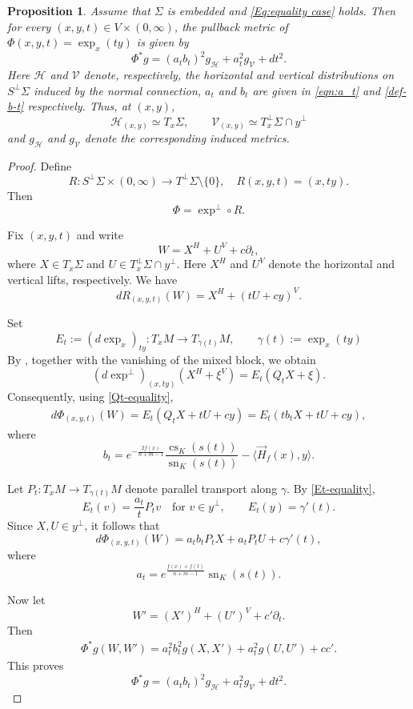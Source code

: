 \documentclass[psamsfonts]{amsart}
\newtheorem{prop}[thm]{Proposition}
\theoremstyle{definition}
\theoremstyle{remark}
\numberwithin{equation}{section}
\begin{document}
\begin{prop}\label{prop:equality-Pulledback} Assume that $\Sigma$ is embedded and \eqref{Eq:equality case} holds. Then for every $(x,y,t)\in V\times(0,\infty)$, the pullback metric of
    $\Phi(x,y,t)=\exp_x(ty)$ is given by
    $$\Phi^*g = (a_t  b_t )^2 g_{\mathcal H} + a_t^2 g_{\mathcal V} + dt^2.$$
    Here $\mathcal H$ and $\mathcal V$ denote, respectively, the horizontal and vertical distributions on $S^\perp\Sigma$ induced by the normal connection, $a_t$ and $b_t$ are given in \eqref{eqn:a_t} and \eqref{def-b-t} respectively. Thus, at $(x,y)$,
    $$\mathcal H_{(x,y)}\simeq T_x\Sigma, \qquad \mathcal V_{(x,y)}\simeq T_x^\perp\Sigma\cap y^\perp$$
    and $g_{\mathcal H}$ and $g_{\mathcal V}$ denote the corresponding induced metrics.
\end{prop}
\begin{proof}
    Define 
    $$R: S^\perp \Sigma \times (0,\infty) \longrightarrow T^\perp \Sigma \setminus \{0\}, \quad R(x,y,t) = (x,ty).$$ 
    Then
    $$\Phi = \exp^\perp \circ R.$$

    Fix $(x,y,t)$ and write
    $$W=X^H+U^V+c\partial_t,$$
    where
    $X \in T_x\Sigma$ and $U\in T_x^\perp\Sigma\cap y^\perp.$
    Here $X^H$ and $U^V$ denote the horizontal and vertical lifts, respectively. We have
    $$dR_{(x,y,t)}(W) = X^H+(tU+cy)^V.$$

    Set
    $$E_t:=(d\exp_x)_{ty}:T_xM\longrightarrow T_{\gamma(t)}M, \qquad  \gamma(t):=\exp_x(ty)$$
    By \cite[Lemma 3.2]{Pan-Yi2026},  together with the vanishing of the mixed block, we obtain
    $$(d\exp^\perp)_{(x,ty)}(X^H+\xi^V) = E_t(Q_tX+\xi).$$
    Consequently, using \eqref{Qt-equality},
    \begin{align*}
        d\Phi_{(x,y,t)}(W)  =  E_t(Q_tX+tU+cy)
         = E_t(t b_t X+tU+cy),
    \end{align*}
    where 
    \begin{equation}\label{def-b-t}
        b_t  = e^{-\frac{2f(x)}{n+m-1}} \frac{\operatorname{cs}_K (s(t))}{\operatorname{sn}_K(s(t))} - \langle \vec H_f(x), y \rangle. 
    \end{equation}

    Let $P_t:T_xM\to T_{\gamma(t)}M$ denote parallel transport along $\gamma$. By \eqref{Et-equality},
    $$E_t(v)=\frac{a_t}{t}P_tv \quad\text{for }v\in y^\perp, \qquad E_t(y)=\gamma'(t).$$
    Since $X,U\in y^\perp$, it follows that
    $$d\Phi_{(x,y,t)}(W)= a_t b_t  P_tX + a_tP_tU + c\gamma'(t),$$
    where
    \begin{equation}
        a_t = e^{\frac{f(x) + f(t)}{n+m-1}} \operatorname{sn}_K(s(t)).  \label{eqn:a_t}
        \end{equation}

    Now let
    $$W'=(X')^H+(U')^V+c'\partial_t.$$    
    Then 
    \begin{align*}
        \Phi^* g (W,W')
         = a_t^2 b_t^2 g (X , X') + a_t^2  g( U, U')  + cc'.
    \end{align*}
    This proves
    $$\Phi^*g = (a_t  b_t )^2 g_{\mathcal H} + a_t^2 g_{\mathcal V} + dt^2.$$
    \end{proof}
\end{document}
